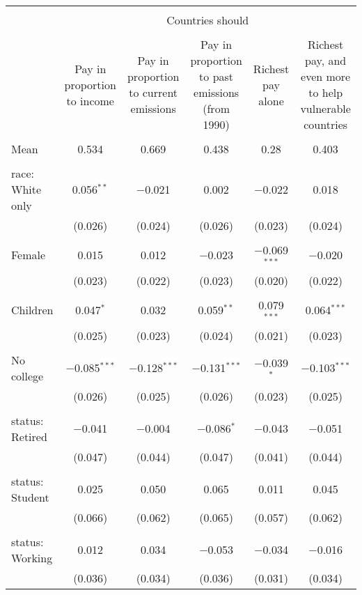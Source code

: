 
\begin{tabular}{@{\extracolsep{5pt}}lccccc} 
\\[-1.8ex]\hline 
\hline \\[-1.8ex] 
 & \multicolumn{5}{c}{Countries should} \\ 
\cline{2-6} 
\\[-1.8ex] & Pay in proportion to income & Pay in proportion to current emissions & Pay in proportion to past emissions (from 1990) & Richest pay alone & Richest pay, and even more to help vulnerable countries \\ 
\hline \\[-1.8ex] 
 Mean & 0.534 & 0.669 & 0.438 & 0.28 & 0.403  \\ \hline \\[-1.8ex] race: White only & 0.056$^{**}$ & $-$0.021 & 0.002 & $-$0.022 & 0.018 \\ 
  & (0.026) & (0.024) & (0.026) & (0.023) & (0.024) \\ 
  & & & & & \\ 
 Female & 0.015 & 0.012 & $-$0.023 & $-$0.069$^{***}$ & $-$0.020 \\ 
  & (0.023) & (0.022) & (0.023) & (0.020) & (0.022) \\ 
  & & & & & \\ 
 Children & 0.047$^{*}$ & 0.032 & 0.059$^{**}$ & 0.079$^{***}$ & 0.064$^{***}$ \\ 
  & (0.025) & (0.023) & (0.024) & (0.021) & (0.023) \\ 
  & & & & & \\ 
 No college & $-$0.085$^{***}$ & $-$0.128$^{***}$ & $-$0.131$^{***}$ & $-$0.039$^{*}$ & $-$0.103$^{***}$ \\ 
  & (0.026) & (0.025) & (0.026) & (0.023) & (0.025) \\ 
  & & & & & \\ 
 status: Retired & $-$0.041 & $-$0.004 & $-$0.086$^{*}$ & $-$0.043 & $-$0.051 \\ 
  & (0.047) & (0.044) & (0.047) & (0.041) & (0.044) \\ 
  & & & & & \\ 
 status: Student & 0.025 & 0.050 & 0.065 & 0.011 & 0.045 \\ 
  & (0.066) & (0.062) & (0.065) & (0.057) & (0.062) \\ 
  & & & & & \\ 
 status: Working & 0.012 & 0.034 & $-$0.053 & $-$0.034 & $-$0.016 \\ 
  & (0.036) & (0.034) & (0.036) & (0.031) & (0.034) \\ 

\end{tabular}
